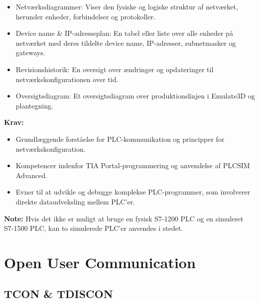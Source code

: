 \begin{enumerate}
\begin{itemize}
		\item Netværksdiagrammer: Viser den fysiske og logiske struktur af netværket, herunder enheder, forbindelser og protokoller.
		\item Device name \& IP-adresseplan: En tabel eller liste over alle enheder på netværket med deres tildelte device name, IP-adresser, subnetmasker og gateways.
		\item Revisionshistorik: En oversigt over ændringer og opdateringer til netværkskonfigurationen over tid.
		\item Oversigtsdiagram: Et oversigtsdiagram over produktionslinjen i Emulate3D og plantegning.
	\end{itemize}
\end{enumerate}

\textbf{Krav:}
\begin{itemize}
	\item Grundlæggende forståelse for PLC-kommunikation og principper for netværkskonfiguration.
	\item Kompetencer indenfor TIA Portal-programmering og anvendelse af PLCSIM Advanced.
	\item Evner til at udvikle og debugge komplekse PLC-programmer, som involverer direkte dataudveksling mellem PLC'er.
\end{itemize}
\textbf{Note:} Hvis det ikke er muligt at bruge en fysisk S7-1200 PLC og en simuleret S7-1500 PLC, kan to simulerede PLC'er anvendes i stedet.

\section{Open User Communication}
\subsection*{TCON \& TDISCON}
\label{subsec:tcon_}

